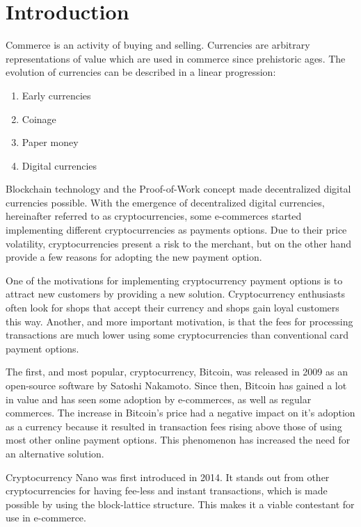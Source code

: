 \documentclass{ferseminar}
\begin{document}
\stvoripredstranice
\section{Introduction}
Commerce is an activity of buying and selling. Currencies are arbitrary representations of value which are used in commerce since prehistoric ages. The evolution of currencies can be described in a linear progression:

\begin{enumerate}
	\item Early currencies
	\item Coinage
	\item Paper money
	\item Digital currencies
\end{enumerate}

Blockchain technology and the Proof-of-Work concept made decentralized digital currencies possible. With the emergence of decentralized digital currencies, hereinafter referred to as cryptocurrencies, some e-commerces started implementing different cryptocurrencies as payments options. Due to their price volatility, cryptocurrencies present a risk to the merchant, but on the other hand provide a few reasons for adopting the new payment option.

One of the motivations for implementing cryptocurrency payment options is to attract new customers by providing a new solution. Cryptocurrency enthusiasts often look for shops that accept their currency and shops gain loyal customers this way. Another, and more important motivation, is that the fees for processing transactions are much lower using some cryptocurrencies than conventional card payment options.

The first, and most popular, cryptocurrency, Bitcoin, was released in 2009 as an open-source software by Satoshi Nakamoto. Since then, Bitcoin has gained a lot in value and has seen some adoption by e-commerces, as well as regular commerces. The increase in Bitcoin's price had a negative impact on it's adoption as a currency because it resulted in transaction fees rising above those of using most other online payment options. This phenomenon has increased the need for an alternative solution.

Cryptocurrency Nano was first introduced in 2014. It stands out from other cryptocurrencies for having fee-less and instant transactions, which is made possible by using the block-lattice structure. This makes it a viable contestant for use in e-commerce.
\end{document}
